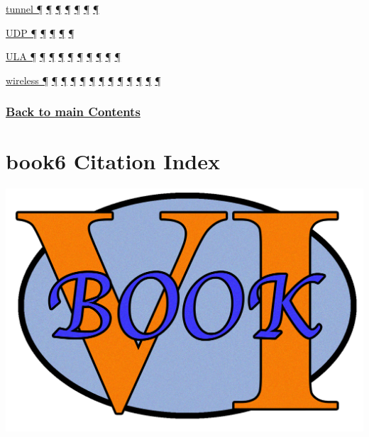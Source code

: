 \documentclass[
]{article}
\begin{document}
\hyperref[layer-2-functions]{tunnel ¶}
\hyperref[traffic-class-and-flow-label]{¶}
\hyperref[coexistence-with-legacy-ipv4]{¶}
\hyperref[dual-stack-scenarios]{¶} \hyperref[obsolete-techniques]{¶}
\hyperref[tunnels]{¶} \hyperref[layer-2-considerations]{¶}

\hyperref[extension-headers-and-options]{UDP ¶}
\hyperref[managed-configuration]{¶} \hyperref[packet-format]{¶}
\hyperref[transport-protocols]{¶} \hyperref[obsolete-techniques]{¶}

\hyperref[addresses]{ULA ¶} \hyperref[auto-configuration]{¶}
\hyperref[dns]{¶} \hyperref[source-and-destination-address-selection]{¶}
\hyperref[ipv6-primary-differences-from-ipv4]{¶}
\hyperref[translation-and-ipv4-as-a-service]{¶} \hyperref[filtering]{¶}
\hyperref[topology-obfuscation]{¶} \hyperref[multi-prefix-operation]{¶}
\hyperref[multihoming]{¶}

\hyperref[address-resolution]{wireless ¶}
\hyperref[auto-configuration]{¶} \hyperref[layer-2-functions]{¶}
\hyperref[managed-configuration]{¶} \hyperref[routing]{¶}
\hyperref[ipv6-primary-differences-from-ipv4]{¶}
\hyperref[layer-2-considerations]{¶} \hyperref[address-planning]{¶}
\hyperref[address-and-prefix-management]{¶}
\hyperref[multi-prefix-operation]{¶} \hyperref[multihoming]{¶}
\hyperref[deployment-by-carriers]{¶}
\hyperref[deployment-in-the-home]{¶}

\subsubsection{\texorpdfstring{\hyperref[list-of-contents]{Back to main
Contents}}{Back to main Contents}}\label{back-to-main-contents-11}

\pagebreak

\section{book6 Citation Index}\label{book6-citation-index}

\includegraphics{book6logo.png}
\end{document}
